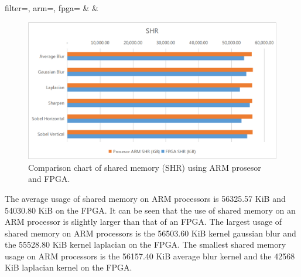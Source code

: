 \begin{atable}
    \caption{Comparison table of shared memory (SHR) using ARM prosesor and FPGA.}
    \label{table:hasil-shr}
        {
            filter=\filter, 
            arm=\arm, 
            fpga=\fpga}
        {
            \filter & 
            \arm & 
            \fpga }
\end{atable}
\begin{figure}[ht]
    \includegraphics[width=0.81\linewidth, center]{images/chart/chart-shr.png}
    \caption{Comparison chart of shared memory (SHR) using ARM prosesor and FPGA.}
    \label{fig:chart-shr}
\end{figure}

The average usage of shared memory on ARM processors is 56325.57 KiB and 54030.80 KiB on the FPGA. It can be seen that the use of shared memory on an ARM processor is slightly larger than that of an FPGA. The largest usage of shared memory on ARM processors is the 56503.60 KiB kernel gaussian blur and the 55528.80 KiB kernel laplacian on the FPGA. The smallest shared memory usage on ARM processors is the 56157.40 KiB average blur kernel and the 42568 KiB laplacian kernel on the FPGA.

